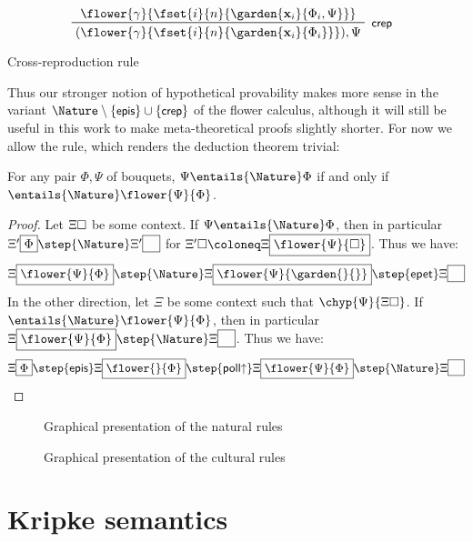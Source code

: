 \begin{marginfigure}
  $$
  \R[\rsf{crep}]
    {\flower{\gamma}{\fset{i}{n}{\garden{\bx_i}{\Phi_i, \Psi}}}}
    {(\flower{\gamma}{\fset{i}{n}{\garden{\bx_i}{\Phi_i}}}), \Psi}
  $$
  \caption{Cross-reproduction rule}
\end{marginfigure}

Thus our stronger notion of hypothetical provability makes more sense in the
variant $\Nature \setminus \{\rsf{epis}\} \cup \{\rsf{crep}\}$ of the
flower calculus, although it will still be useful in this work to make
meta-theoretical proofs slightly shorter. For now we allow the
{} rule, which renders the deduction theorem trivial:

\begin{theorem}[Deduction]
  For any pair $\Phi, \Psi$ of bouquets, $\Psi \entails{\Nature} \Phi$ if and only if
  $\entails{\Nature} \flower{\Psi}{\Phi}$.
\end{theorem}
\begin{proof}
  Let $\Xi\square$ be some context. If $\Psi \entails{\Nature} \Phi$, then in
  particular $\cfill{\Xi'}{\Phi} \step{\Nature} \cfill{\Xi'}{\phantom{\Phi}}$
  for $\Xi'\hole \deq \cfill{\Xi}{\flower{\Psi}{\square}}$. Thus we have:
  $$
  \cfill{\Xi}{\flower{\Psi}{\Phi}} \step{\Nature}
  \cfill{\Xi}{\flower{\Psi}{\garden{{}}{{}}}} \step{\mathsf{epet}}
  \cfill{\Xi}{\phantom{\Phi}}
  $$
  In the other direction, let $\Xi$ be some context such that
  $\chyp{\Psi}{\Xi\hole}$. If $\entails{\Nature}
  \flower{\Psi}{\Phi}$, then in particular
  $\cfill{\Xi}{\flower{\Psi}{\Phi}} \step{\Nature}
  \cfill{\Xi}{\phantom{\Phi}}$. Thus we have:
  $$
  \cfill{\Xi}{\Phi} \step{\mathsf{epis}}
  \cfill{\Xi}{\flower{{}}{\Phi}} \step{\mathsf{poll{\ua}}}
  \cfill{\Xi}{\flower{\Psi}{\Phi}} \step{\Nature}
  \cfill{\Xi}{\phantom{\Phi}}
  $$
\end{proof}

\begin{figure*}[h!]
  
  \caption{Graphical presentation of the natural rules}
\end{figure*}

\begin{figure*}[h!]
  
  \caption{Graphical presentation of the cultural rules}
\end{figure*}

\section{Kripke semantics}


